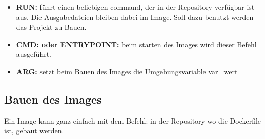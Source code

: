 \begin{frame}
    \slidehead
    \Large
    \begin{itemize}[<+->]
        \item \textbf{RUN: } führt einen beliebigen command, der in der Repository verfügbar ist aus.
              Die Ausgabedateien bleiben dabei im Image. Soll dazu benutzt werden das Projekt zu Bauen.
        \item \textbf{CMD: oder ENTRYPOINT:} beim starten des Images wird dieser Befehl ausgeführt.
        \item \textbf{ARG: } setzt beim Bauen des Images die Umgebungsvariable var=wert
    \end{itemize}
\end{frame}

\subsection{Bauen des Images}
\begin{frame}
    \slidehead
    \Large
    \centering
    Ein Image kann ganz einfach mit dem Befehl:
    \vspace{1em}
    \normalsize
    \vspace{1em}
    \Large
    in der Repository wo die Dockerfile ist, gebaut werden.
\end{frame}



